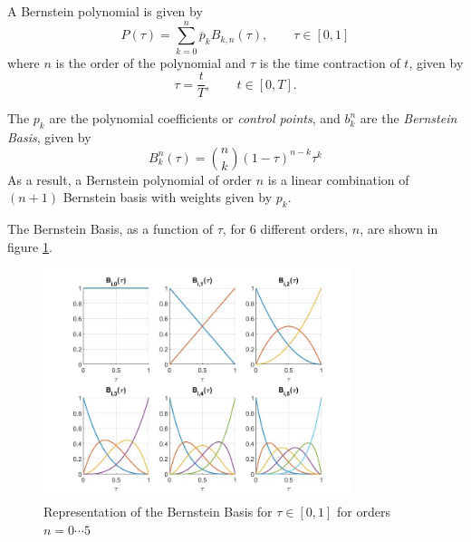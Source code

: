 \par A Bernstein polynomial is given by %
\begin{equation}
    \label{eq:bern_pol}
    P(\tau) = \sum_{k=0}^n \overline{p}_k B_{k,n} (\tau), \qquad \tau\in [0,1]
\end{equation}
where $n$ is the order of the polynomial and $\tau$ is the time contraction of $t$, given by 
\begin{equation}
    \tau = \frac{t}{T}, \qquad t\in [0,T].
    \label{eq:time_delay}
\end{equation}
\par The $p_k$ are the polynomial coefficients or \textit{control points}, and $b_k^n$ are the \textit{Bernstein Basis}, given by 
\begin{equation}
	B^n_k {(\tau)} = \binom{n}{k} {(1 - \tau)}^{n-k} \tau^k
    \label{eq:bern_basis}
\end{equation}
As a result, a Bernstein polynomial of order $n$ is a linear combination of $(n+1)$ Bernstein basis with weights given by $p_k$.
\par The Bernstein Basis, as a function of $\tau$, for 6 different orders, $n$, are shown in figure \ref{fig:bernsteinbasis}.

\begin{figure}[h!]
\centering
\includegraphics[width=0.8\textwidth]{Images/bernstein_basis.jpg}
\caption{Representation of the Bernstein Basis for $\tau \in [0,1]$ for orders $n=0\cdots 5$}
\label{fig:bernsteinbasis}
\end{figure}

